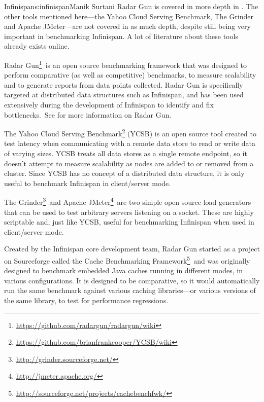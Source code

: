 \begin{aosachapter}{Infinispan}{s:infinispan}{Manik Surtani}
Radar Gun is covered in more depth in
. The other tools mentioned
here---the Yahoo Cloud Serving Benchmark, The Grinder and Apache
JMeter---are not covered in as much depth, despite still being very
important in benchmarking Infinispan. A lot of literature about these
tools already exists online.


Radar Gun\footnote{\url{https://github.com/radargun/radargun/wiki}}~is
an open source benchmarking framework that was designed to perform
comparative (as well as competitive) benchmarks, to measure scalability
and to generate reports from data points collected. Radar Gun is
specifically targeted at distributed data structures such as Infinispan,
and has been used extensively during the development of Infinispan to
identify and fix bottlenecks.~See 
for more information on Radar Gun.


The Yahoo Cloud Serving Benchmark\footnote{\url{https://github.com/brianfrankcooper/YCSB/wiki}}
(YCSB) is an open source tool created to test latency when communicating
with a remote data store to read or write data of varying sizes. YCSB
treats all data stores as a single remote endpoint, so it doesn't
attempt to measure scalability as nodes are added to or removed from a
cluster. Since YCSB has no concept of a distributed data structure, it
is only useful to benchmark Infinispan in client/server mode.


The Grinder\footnote{\url{http://grinder.sourceforge.net/}}~and Apache
JMeter\footnote{\url{http://jmeter.apache.org/}}~are two simple open
source load generators that can be used to test arbitrary servers
listening on a socket. These are highly scriptable and, just like YCSB,
useful for benchmarking Infinispan when used in client/server mode.


\label{posa.infinispan.radargun}


Created by the Infinispan core development team, Radar Gun started as a
project on Sourceforge called the Cache Benchmarking Framework\footnote{\url{http://sourceforge.net/projects/cachebenchfwk/}}~and
was originally designed to benchmark embedded Java caches running in
different modes, in various configurations. It is designed to be
comparative, so it would automatically run the same benchmark against
various caching libraries---or various versions of the same library, to
test for performance regressions. 


\end{aosachapter}

